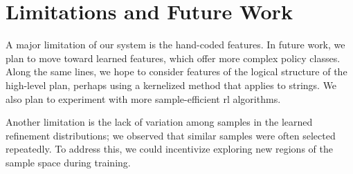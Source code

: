 \section{Limitations and Future Work}
A major limitation of our system is the hand-coded features. In future work, we
plan to move toward learned features, which offer more complex policy classes. Along the same
lines, we hope to consider features of the logical structure of the high-level plan, perhaps
using a kernelized method that applies to strings. We also plan to experiment with more
sample-efficient {\sc rl} algorithms.

Another limitation is the lack of variation among samples in the learned refinement distributions;
we observed that similar samples were often selected repeatedly. To address
this, we could incentivize exploring new regions of the sample space during training.